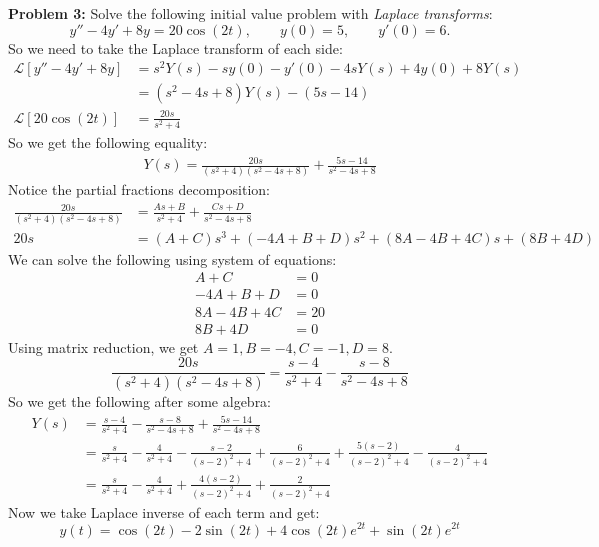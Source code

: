 \documentclass[12pt]{article}
\begin{document}
\newpage 

\noindent \textbf{Problem 3: }Solve the following initial value problem with \textit{Laplace transforms}:
	$$
	y'' - 4y' + 8y = 20\cos(2t), \qquad y(0) = 5, \qquad y'(0) = 6.
	$$
So we need to take the Laplace transform of each side:
	\begin{align*}
		\mathcal{L}[y'' - 4y' + 8y] &= s^2Y(s) -sy(0) - y'(0) - 4sY(s) + 4y(0) + 8Y(s) \\
		&= (s^2 - 4s + 8)Y(s) - (5s - 14) \\
		\mathcal{L}[20\cos(2t)] &= \frac{20s}{s^2 + 4}
	\end{align*}
So we get the following equality:
	\begin{align*}
		Y(s) = \frac{20s}{(s^2 + 4)(s^2 - 4s + 8)} + \frac{5s - 14}{s^2 - 4s + 8}
	\end{align*}
Notice the partial fractions decomposition:
	\begin{align*}
		\frac{20s}{(s^2 + 4)(s^2 - 4s + 8)} &= \frac{As + B}{s^2 + 4} + \frac{Cs + D}{s^2 - 4s + 8} \\
		20s &= (A+C)s^3 + (-4A + B + D)s^2 + (8A - 4B + 4C)s + (8B + 4D)
	\end{align*}	
We can solve the following using system of equations:
	\begin{align*}
		A + C &= 0 \\
		-4A + B + D &= 0 \\
		8A - 4B + 4C &= 20 \\
		8B + 4D &= 0
	\end{align*}
Using matrix reduction, we get $A = 1, B = -4, C = -1, D = 8$.
	$$
	\frac{20s}{(s^2 + 4)(s^2 - 4s + 8)} = \frac{s - 4}{s^2 + 4} - \frac{s - 8}{s^2 - 4s + 8}
	$$
So we get the following after some algebra:
	\begin{align*}
		Y(s) &= \frac{s - 4}{s^2 + 4} - \frac{s - 8}{s^2 - 4s + 8} + \frac{5s - 14}{s^2 - 4s + 8} \\
		&= \frac{s}{s^2 + 4} - \frac{4}{s^2 + 4} - \frac{s - 2}{(s-2)^2 + 4} + \frac{6}{(s-2)^2 + 4} + \frac{5(s-2)}{(s-2)^2 + 4} - \frac{4}{(s-2)^2 + 4} \\
		&= \frac{s}{s^2 + 4} - \frac{4}{s^2 + 4} + \frac{4(s - 2)}{(s-2)^2 + 4} + \frac{2}{(s-2)^2 + 4}
	\end{align*}
Now we take Laplace inverse of each term and get:
	$$
	y(t) = \cos(2t) - 2\sin(2t) +  4\cos(2t)e^{2t} + \sin(2t)e^{2t} 
	$$
	
	
	
	
	
	
	
	
	
	
	
	
	
	
	
	
	
	
	
	
\end{document}
